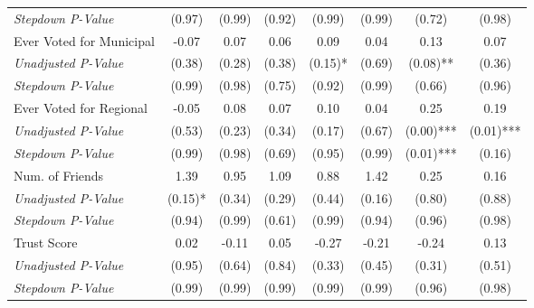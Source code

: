 \begin{tabular}{l c c c c c c c}
\quad \textit{Stepdown P-Value} & (0.97) & (0.99) & (0.92) & (0.99) & (0.99) & (0.72) & (0.98) \\
Ever Voted for Municipal & -0.07 & 0.07 & 0.06 & 0.09 & 0.04 & 0.13 & 0.07 \\
\quad \textit{Unadjusted P-Value} & (0.38) & (0.28) & (0.38) & (0.15)* & (0.69) & (0.08)** & (0.36) \\
\quad \textit{Stepdown P-Value} & (0.99) & (0.98) & (0.75) & (0.92) & (0.99) & (0.66) & (0.96) \\
Ever Voted for Regional & -0.05 & 0.08 & 0.07 & 0.10 & 0.04 & 0.25 & 0.19 \\
\quad \textit{Unadjusted P-Value} & (0.53) & (0.23) & (0.34) & (0.17) & (0.67) & (0.00)*** & (0.01)*** \\
\quad \textit{Stepdown P-Value} & (0.99) & (0.98) & (0.69) & (0.95) & (0.99) & (0.01)*** & (0.16) \\
Num. of Friends & 1.39 & 0.95 & 1.09 & 0.88 & 1.42 & 0.25 & 0.16 \\
\quad \textit{Unadjusted P-Value} & (0.15)* & (0.34) & (0.29) & (0.44) & (0.16) & (0.80) & (0.88) \\
\quad \textit{Stepdown P-Value} & (0.94) & (0.99) & (0.61) & (0.99) & (0.94) & (0.96) & (0.98) \\
Trust Score & 0.02 & -0.11 & 0.05 & -0.27 & -0.21 & -0.24 & 0.13 \\
\quad \textit{Unadjusted P-Value} & (0.95) & (0.64) & (0.84) & (0.33) & (0.45) & (0.31) & (0.51) \\
\quad \textit{Stepdown P-Value} & (0.99) & (0.99) & (0.99) & (0.99) & (0.99) & (0.96) & (0.98) \\
\bottomrule
\end{tabular}
